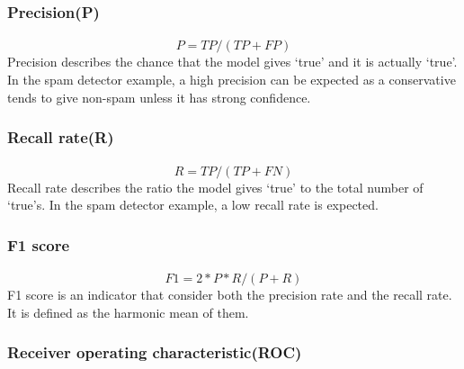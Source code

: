 \subsubsection{Precision(P)}
\paragraph{}
$$P=TP/(TP+FP)$$
Precision describes the chance that the model gives `true' and it is actually `true'.
In the spam detector example, a high precision can be expected as a conservative tends to give non-spam unless it has strong confidence.

\subsubsection{Recall rate(R)}
\paragraph{}
$$R=TP/(TP+FN)$$
Recall rate describes the ratio the model gives `true' to the total number of `true's.
In the spam detector example, a low recall rate is expected.

\subsubsection{F1 score}
\paragraph{}
$$F1 = 2*P*R/(P+R)$$
F1 score is an indicator that consider both the precision rate and the recall rate.
It is defined as the harmonic mean of them.

\subsubsection{Receiver operating characteristic(ROC)}
